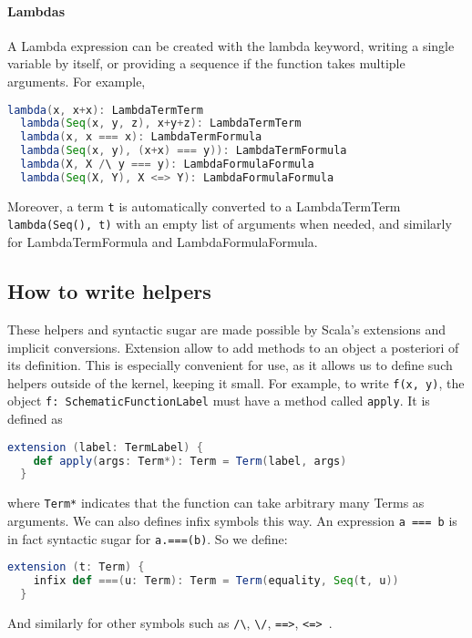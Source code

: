 \paragraph{Lambdas}
A Lambda expression can be created with the lambda keyword, writing a single variable by itself, or providing a sequence if the function takes multiple arguments. For example,
\begin{lstlisting}[language=Scala]
  lambda(x, x+x): LambdaTermTerm
  lambda(Seq(x, y, z), x+y+z): LambdaTermTerm
  lambda(x, x === x): LambdaTermFormula
  lambda(Seq(x, y), (x+x) === y)): LambdaTermFormula
  lambda(X, X /\ y === y): LambdaFormulaFormula
  lambda(Seq(X, Y), X <=> Y): LambdaFormulaFormula
\end{lstlisting}
Moreover, a term \lstinline|t| is automatically converted to a LambdaTermTerm \lstinline|lambda(Seq(), t)| with an empty list of arguments when needed, and similarly for LambdaTermFormula and LambdaFormulaFormula.

\vspace{2em}
\subsection{How to write helpers}
These helpers and syntactic sugar are made possible by Scala's extensions and implicit conversions. Extension allow to add methods to an object a posteriori of its definition. This is especially convenient for use, as it allows us to define such helpers outside of the kernel, keeping it small.
For example, to write \lstinline|f(x, y)|, the object \lstinline|f: SchematicFunctionLabel| must have a method called \lstinline|apply|. It is defined as
\begin{lstlisting}[language=Scala]
  extension (label: TermLabel) {
    def apply(args: Term*): Term = Term(label, args)
  }
\end{lstlisting}
where \lstinline|Term*| indicates that the function can take arbitrary many Terms as arguments.
We can also defines infix symbols this way. An expression \lstinline|a === b| is in fact syntactic sugar for \lstinline|a.===(b)|. So we define:
\begin{lstlisting}[language=Scala]
  extension (t: Term) {
    infix def ===(u: Term): Term = Term(equality, Seq(t, u))
  }
\end{lstlisting}
And similarly for other symbols such as \lstinline|/\|, \lstinline|\/|, \lstinline|==>|, \lstinline|<=> |.

